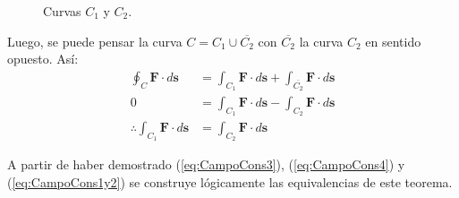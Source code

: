 \begin{theorem}
\begin{figure}[H]
\begin{center}
            \caption{Curvas $C_1$ y $C_2$.}
        \end{center}
    \end{figure}
    Luego, se puede pensar la curva $C=C_1\cup\overline{C_2}$ con $\overline{C_2}$ la curva $C_2$ en sentido opuesto. Así:
    \begin{align*}
        \oint_C\mathbf{F}\cdot d\mathbf{s}&=\int_{C_1}\mathbf{F}\cdot d\mathbf{s}+\int_{\overline{C_2}}\mathbf{F}\cdot d\mathbf{s}\\
        0&=\int_{C_1}\mathbf{F}\cdot d\mathbf{s}-\int_{C_2}\mathbf{F}\cdot d\mathbf{s}\\
        \therefore \int_{C_1}\mathbf{F}\cdot d\mathbf{s}&=\int_{C_2}\mathbf{F}\cdot d\mathbf{s}
    \end{align*}
   
    A partir de haber demostrado (\ref{eq:CampoCons3}), (\ref{eq:CampoCons4}) y (\ref{eq:CampoCons1y2}) se construye lógicamente las equivalencias de este teorema.
\end{theorem}

